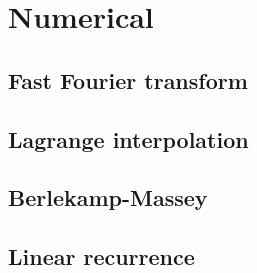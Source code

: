 \section{Numerical}

\subsection{Fast Fourier transform}

\subsection{Lagrange interpolation}

\subsection{Berlekamp-Massey}

\subsection{Linear recurrence}
